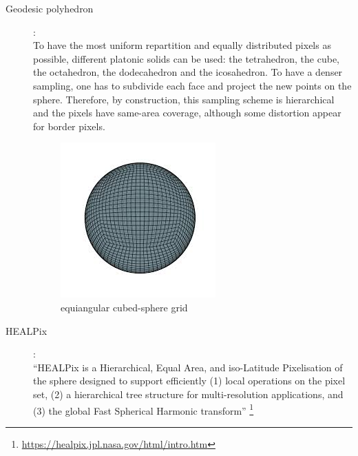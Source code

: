 \documentclass[11pt]{report}
\begin{document}
\begin{description}
        \clearpage
        \item[Geodesic polyhedron] \cite{baumgardner_icosahedral_1985}:\\
        To have the most uniform repartition and equally distributed pixels as possible, different platonic solids can be used: the tetrahedron, the cube, the octahedron, the dodecahedron and the icosahedron. 
        To have a denser sampling, one has to subdivide each face and project the new points on the sphere. Therefore, by construction, this sampling scheme is hierarchical and the pixels have same-area coverage, although some distortion appear for border pixels.
        \begin{figure}[!ht]
            \centering
            \includegraphics[width=0.3\linewidth]{figures/cube_sphere.jpg}
            \caption{equiangular cubed-sphere grid \cite{ronchi_cubed_1996}}
            \label{fig:cube_sphere}
        \end{figure}
        
            \item[HEALPix] \cite{gorski_healpix_2005}:\\
            ``HEALPix is a Hierarchical, Equal Area, and iso-Latitude Pixelisation of the sphere designed to support efficiently (1) local operations on the pixel set, (2) a hierarchical tree structure for multi-resolution applications, and (3) the global Fast Spherical Harmonic transform'' \footnote{\url{https://healpix.jpl.nasa.gov/html/intro.htm}}
            

\end{description}
\end{document}
